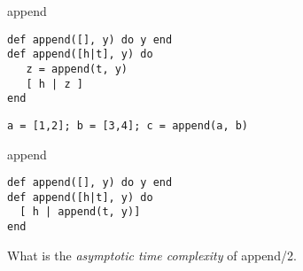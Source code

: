 \begin{frame}[fragile]{append}

\begin{verbatim}
def append([], y) do y end
def append([h|t], y) do
   z = append(t, y)
   [ h | z ]
end
\end{verbatim}

\pause
\begin{verbatim}
a = [1,2]; b = [3,4]; c = append(a, b)
\end{verbatim}

\pause


\end{frame}



\begin{frame}[fragile]{append}

\begin{verbatim}
def append([], y) do y end
def append([h|t], y) do 
  [ h | append(t, y)] 
end
\end{verbatim}

\pause\vspace{20pt} What is the {\em asymptotic time complexity} of append/2.
\end{frame}


